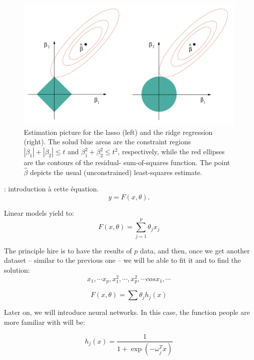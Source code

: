 \begin{figure}
    \includegraphics{./Figures/sparsity.png}
    \caption{Estimation picture for the lasso (left) and the ridge regression
        (right). The solud blue areas are the constraint regions
        $|\beta_1| + |\beta_2| \leq t$ and $\beta_1^2 + \beta_2^2 \leq t^2$,
        respectively, while the red ellipses are the contours of the residual-
        sum-of-squares function. The point $\hat \beta$ depicts the usual
        (unconstrained) least-squares estimate.
    }
    \label{sparsity}
\end{figure}

\TODO: introduction à cette équation.
\begin{equation}
    y=F(x,\theta).
\end{equation}

Linear models yield to:
\begin{equation}
    F(x,\theta) = \sum_{j=1}^p \theta_j x_j
\end{equation}

The principle hire is to have the results of $p$ data, and then, once we get 
another dataset -- similar to the previous one -- we will be able to fit it and
to find the solution:
\begin{equation}
    x_1, \cdots x_p, x_1^2, \cdots, x_p^2, \cdots cos x_1, \cdots
\end{equation}

\begin{equation}
    F(x, \theta) = \sum \theta_j h_j(x)
\end{equation}

Later on, we will introduce neural networks. In this case, the function people
are more familiar with will be:

\begin{equation}
    h_j(x) = \frac{1}{1 + \exp (-\omega_j^T x )}
\end{equation}

